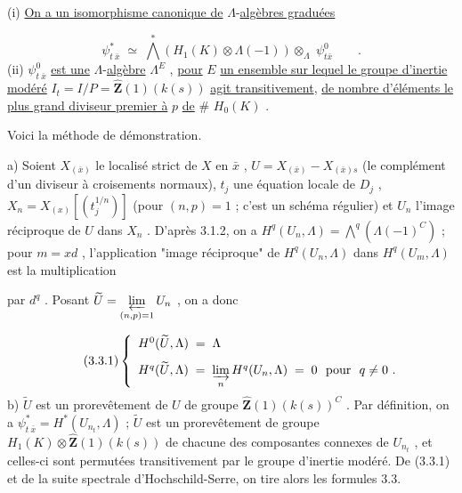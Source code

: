 (i) \underline{On a un isomorphisme canonique de} $\Lambda$-\underline{algèbres graduées}

\begin{equation*}
\psi^{*}_{t\ \bar{x}} \;\simeq\; \overset{*}{\bigwedge}(H_{1}(K) \otimes \Lambda(-1)) \otimes_{\Lambda} \; \psi^{0}_{t\bar{x}} \qquad .
\end{equation*}
(ii) $\psi^{0}_{t\ \bar{x}}$ \underline{est une} $\Lambda$-\underline{algèbre} $\Lambda^{E}$ , \underline{pour} $E$ \underline{un ensemble sur lequel le groupe d'inertie modéré} $I_{t} = I/P = \hat{\mathbf{Z}}(1)(k(s))$ \underline{agit transitivement}, \underline{de nombre d'éléments le plus grand diviseur premier à} $p$ \underline{de} $\#$ $H_{0}(K)$ .

Voici la méthode de démonstration.

a) Soient  $X_{(\bar{x})}$  le localisé strict de  $X$  en  $\bar{x}$ , $U = X_{(\bar{x})} - X_{(\bar{x})s}$  (le complément d'un diviseur à croisements normaux), $t_{j}$  une équation locale de  $D_{j}$ , $X_{n} = X_{(x)}\left[(t_{j}^{1/n})\right]$ (pour  $(n,p) = 1$ ; c'est un schéma régulier) et  $U_{n}$  l'image réciproque de  $U$  dans  $X_{n}$ . D'après 3.1.2, on a  $H^{q}(U_{n},\Lambda) = \overset{q}{\bigwedge}(\Lambda(-1)^{C})$  ; pour  $m = x d$ , l'application "image réciproque" de  $H^{q}(U_{n},\Lambda)$  dans  $H^{q}(U_{m},\Lambda)$  est la multiplication



par  $d^{q}$ . Posant  $\widetilde{U} = \varprojlim\limits_{(n,p)=1} U_{n}$ , on a donc

\begin{equation}\tag{3.3.1}
\left\{\begin{array}{l} H^{0}(\widetilde{U},\Lambda) \;=\; \Lambda \\[8pt] H^{q}(\widetilde{U},\Lambda) \;=\; \varinjlim\limits_{n} H^{q}(U_{n},\Lambda) \;=\; 0 \ \ \text{pour}\ \ q \neq 0 \ . \end{array}\right.
\end{equation}
b) $\widetilde{U}$  est un prorevêtement de  $U$  de groupe  $\hat{\mathbf{Z}}(1)(k(s))^{C}$ . Par définition, on a  $\psi^{*}_{t\ \bar{x}} = H^{*}(U_{n_{t}} ,\Lambda)$ ; $\widetilde{U}$  est un prorevêtement de groupe  $H_{1}(K) \otimes \hat{\mathbf{Z}}(1)(k(s))$  de chacune des composantes connexes de  $U_{n_{t}}$ , et celles-ci sont permutées transitivement par le groupe d'inertie modéré. De (3.3.1) et de la suite spectrale d'Hochschild-Serre, on tire alors les formules 3.3.

